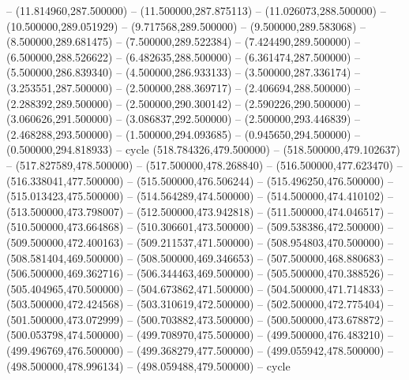 -- (11.814960,287.500000) -- (11.500000,287.875113) -- (11.026073,288.500000) -- (10.500000,289.051929) -- (9.717568,289.500000) -- (9.500000,289.583068) -- (8.500000,289.681475) -- (7.500000,289.522384) -- (7.424490,289.500000) -- (6.500000,288.526622) -- (6.482635,288.500000) -- (6.361474,287.500000) -- (5.500000,286.839340) -- (4.500000,286.933133) -- (3.500000,287.336174) -- (3.253551,287.500000) -- (2.500000,288.369717) -- (2.406694,288.500000) -- (2.288392,289.500000) -- (2.500000,290.300142) -- (2.590226,290.500000) -- (3.060626,291.500000) -- (3.086837,292.500000) -- (2.500000,293.446839) -- (2.468288,293.500000) -- (1.500000,294.093685) -- (0.945650,294.500000) -- (0.500000,294.818933) -- cycle
   (518.784326,479.500000) -- (518.500000,479.102637) -- (517.827589,478.500000) -- (517.500000,478.268840) -- (516.500000,477.623470) -- (516.338041,477.500000) -- (515.500000,476.506244) -- (515.496250,476.500000) -- (515.013423,475.500000) -- (514.564289,474.500000) -- (514.500000,474.410102) -- (513.500000,473.798007) -- (512.500000,473.942818) -- (511.500000,474.046517) -- (510.500000,473.664868) -- (510.306601,473.500000) -- (509.538386,472.500000) -- (509.500000,472.400163) -- (509.211537,471.500000) -- (508.954803,470.500000) -- (508.581404,469.500000) -- (508.500000,469.346653) -- (507.500000,468.880683) -- (506.500000,469.362716) -- (506.344463,469.500000) -- (505.500000,470.388526) -- (505.404965,470.500000) -- (504.673862,471.500000) -- (504.500000,471.714833) -- (503.500000,472.424568) -- (503.310619,472.500000) -- (502.500000,472.775404) -- (501.500000,473.072999) -- (500.703882,473.500000) -- (500.500000,473.678872) -- (500.053798,474.500000) -- (499.708970,475.500000) -- (499.500000,476.483210) -- (499.496769,476.500000) -- (499.368279,477.500000) -- (499.055942,478.500000) -- (498.500000,478.996134) -- (498.059488,479.500000) -- cycle
